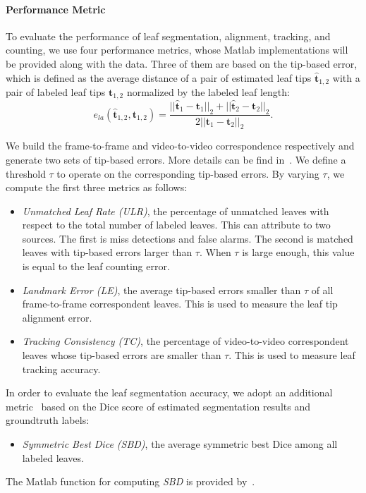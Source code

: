 \paragraph{Performance Metric}
To evaluate the performance of leaf segmentation, alignment, tracking, and counting, we use four performance metrics, whose Matlab implementations will be provided along with the data.
Three of them are based on the tip-based error, which is defined as the average distance of a pair of estimated leaf tips $\hat{\bm{t}}_{1,2}$ with a pair of labeled leaf tips $ \bm{t}_{1,2}$ normalized by the labeled leaf length:
\begin {equation}
e_{la}(\hat{\bm{t}}_{1,2}, \bm{t}_{1,2}) = \frac{||\hat{\bm{t}}_1-{\bm{t}}_1||_2 + ||\hat{\bm{t}}_2-{\bm{t}}_2||_2}{2 ||\bm{t}_1-\bm{t}_2||_2}.
\label{eqn:tipError}
\end{equation}

We build the frame-to-frame and video-to-video correspondence respectively and generate two sets of tip-based errors.
More details can be find in~\cite{yin2015}.
We define a threshold $\tau$ to operate on the corresponding tip-based errors.
By varying $\tau$, we compute the first three metrics as follows:
\begin{itemize}
\item {\it{Unmatched Leaf Rate (ULR)}}, the percentage of unmatched leaves with respect to the total number of labeled leaves.
This can attribute to two sources.
The first is miss detections and false alarms.
The second is matched leaves with tip-based errors larger than $\tau$.
When $\tau$ is large enough, this value is equal to the leaf counting error.
\item {\it{Landmark Error (LE)}}, the average tip-based errors smaller than $\tau$ of all frame-to-frame correspondent leaves.
This is used to measure the leaf tip alignment error.
\item {\it{Tracking Consistency (TC)}}, the percentage of video-to-video correspondent leaves whose tip-based errors are smaller than $\tau$.
This is used to measure leaf tracking accuracy.
\end{itemize}

In order to evaluate the leaf segmentation accuracy, we adopt an additional metric~\cite{scharr2014annotated} based on the Dice score of estimated segmentation results and groundtruth labels:
\begin{itemize}
\item {\it{Symmetric Best Dice (SBD)}}, the average symmetric best Dice among all labeled leaves.
\end{itemize}
The Matlab function for computing {\it{SBD}} is provided by~\cite{scharr2014annotated}.


